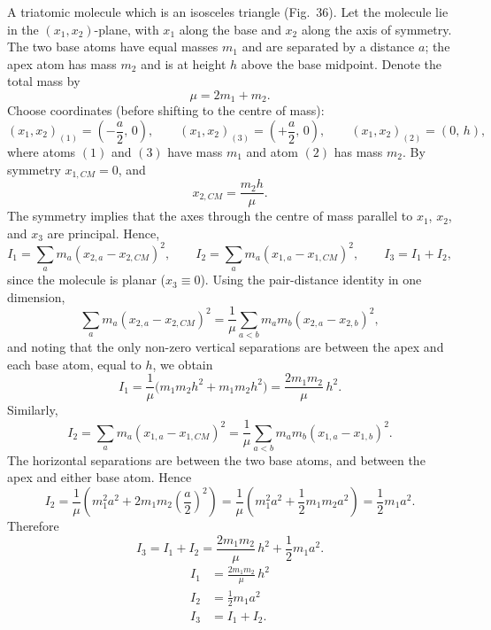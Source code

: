 \begin{subproblem}
{
A triatomic molecule which is an isosceles triangle (Fig.~36).
}
{
Let the molecule lie in the $(x_1,x_2)$-plane, with $x_1$ along the base and $x_2$ along the axis of symmetry. The two base atoms have equal masses $m_1$ and are separated by a distance $a$; the apex atom has mass $m_2$ and is at height $h$ above the base midpoint. Denote the total mass by
\begin{equation*}
    \mu = 2m_1 + m_2.
\end{equation*}
Choose coordinates (before shifting to the centre of mass):
\begin{equation*}
    ( x_1,x_2 )_{(1)}=\left(-\frac a2,\,0\right),\qquad
    ( x_1,x_2 )_{(3)}=\left(+\frac a2,\,0\right),\qquad
    ( x_1,x_2 )_{(2)}=\left(0,\,h\right),
\end{equation*}
where atoms $(1)$ and $(3)$ have mass $m_1$ and atom $(2)$ has mass $m_2$. By symmetry $x_{1,CM}=0$, and
\begin{equation*}
    x_{2,CM}=\frac{m_2 h}{\mu}.
\end{equation*}
The symmetry implies that the axes through the centre of mass parallel to $x_1$, $x_2$, and $x_3$ are principal. Hence,
\begin{equation*}
    I_1 = \sum_a m_a (x_{2,a}-x_{2,CM})^2,\qquad
    I_2 = \sum_a m_a (x_{1,a}-x_{1,CM})^2,\qquad
    I_3 = I_1+I_2,
\end{equation*}
since the molecule is planar ($x_3\equiv 0$). Using the pair-distance identity in one dimension,
\begin{equation*}
    \sum_a m_a (x_{2,a}-x_{2,CM})^2=\frac1\mu\sum_{a<b} m_a m_b (x_{2,a}-x_{2,b})^2,
\end{equation*}
and noting that the only non-zero vertical separations are between the apex and each base atom, equal to $h$, we obtain
\begin{equation*}
    I_1=\frac1\mu\Big( m_1m_2 h^2 + m_1m_2 h^2 \Big)
    =\frac{2m_1m_2}{\mu}\,h^2.
\end{equation*}
Similarly,
\begin{equation*}
    I_2=\sum_a m_a (x_{1,a}-x_{1,CM})^2
    =\frac1\mu\sum_{a<b} m_a m_b (x_{1,a}-x_{1,b})^2.
\end{equation*}
The horizontal separations are between the two base atoms, and between the apex and either base atom. Hence
\begin{equation*}
    I_2=\frac1\mu\left(m_1^2a^2 + 2m_1m_2\left(\frac a2\right)^2\right)
    =\frac1\mu\left(m_1^2a^2+\frac12 m_1m_2a^2\right)
    =\frac12 m_1 a^2.
\end{equation*}
Therefore
\begin{equation*}
    I_3 = I_1+I_2 = \frac{2m_1m_2}{\mu}\,h^2 + \frac12 m_1 a^2.
\end{equation*}
}
{
\begin{align*}
    I_1&=\frac{2m_1m_2}{\mu}\,h^2 \\
    I_2&=\frac12 m_1 a^2 \\
    I_3&=I_1+I_2.
\end{align*}
}
\end{subproblem}

